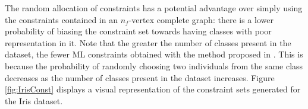 The random allocation of constraints has a potential advantage over simply using the constraints contained in an $n_f$-vertex complete graph: there is a lower probability of biasing the constraint set towards having classes with poor representation in it. Note that the greater the number of classes present in the dataset, the fewer \acs{ML} constraints obtained with the method proposed in \cite{wagstaff2001constrained}. This is because the probability of randomly choosing two individuals from the same class decreases as the number of classes present in the dataset increases. Figure \ref{fig:IrisConst} displays a visual representation of the constraint sets generated for the Iris dataset.

\begin{figure}[bth]
	\myfloatalign
	 \quad
	 \quad

\end{figure}
